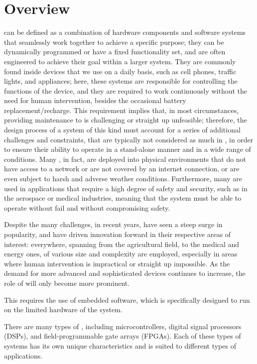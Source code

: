 \section{Overview}
\ess can be defined as a combination of hardware components and software systems that seamlessly work together to achieve a specific purpose; they can be dynamically programmed or have a fixed functionality set, and are often engineered to achieve their goal within a larger system. They are commonly found inside devices that we use on a daily basis, such as cell phones, traffic lights, and appliances; here, these systems are responsible for controlling the functions of the device, and they are required to work continuously without the need for human intervention, besides the occasional battery replacement/recharge.
This requirement implies that, in most circumstances, providing maintenance to \ess is challenging or straight up unfeasible; therefore, the design process of a system of this kind must account for a series of additional challenges and constraints, that are typically not considered as much in \noess, in order to ensure their ability to operate in a stand-alone manner and in a wide range of conditions. Many \ess, in fact, are deployed into physical environments that do not have access to a network or are not covered by an internet connection, or are even subject to harsh and adverse weather conditions.
Furthermore, many \ess are used in applications that require a high degree of safety and security, such as in the aerospace or medical industries, meaning that the system must be able to operate without fail and without compromising safety. 

Despite the many challenges, in recent years, \ess have seen a steep surge in popularity, and have driven innovation forward in their respective areas of interest: everywhere, spanning from the agricultural field, to the medical and energy ones, \ess of various size and complexity are employed, especially in areas where human intervention is impractical or straight up impossible.
As the demand for more advanced and sophisticated devices continues to increase, the role of \ess will only become more prominent.



This requires the use of embedded software, which is specifically designed to run on the limited hardware of the system.

There are many types of \ess, including microcontrollers, digital signal processors (DSPs), and field-programmable gate arrays (FPGAs). Each of these types of systems has its own unique characteristics and is suited to different types of applications.





